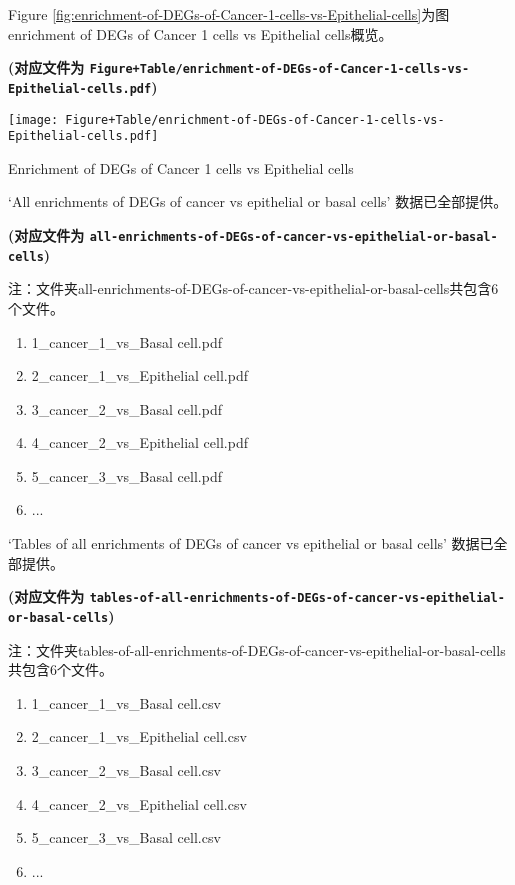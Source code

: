 \documentclass[
]{article}
\providecommand{\tightlist}{%
  \setlength{\itemsep}{0pt}\setlength{\parskip}{0pt}}
\begin{document}
Figure \ref{fig:enrichment-of-DEGs-of-Cancer-1-cells-vs-Epithelial-cells}为图enrichment of DEGs of Cancer 1 cells vs Epithelial cells概览。

\textbf{(对应文件为 \texttt{Figure+Table/enrichment-of-DEGs-of-Cancer-1-cells-vs-Epithelial-cells.pdf})}

\def\@captype{figure}
\begin{center}
\texttt{[image: Figure+Table/enrichment-of-DEGs-of-Cancer-1-cells-vs-Epithelial-cells.pdf]}
\caption{Enrichment of DEGs of Cancer 1 cells vs Epithelial cells}\label{fig:enrichment-of-DEGs-of-Cancer-1-cells-vs-Epithelial-cells}
\end{center}

`All enrichments of DEGs of cancer vs epithelial or basal cells' 数据已全部提供。

\textbf{(对应文件为 \texttt{all-enrichments-of-DEGs-of-cancer-vs-epithelial-or-basal-cells})}

\begin{center}\begin{tcolorbox}[colback=gray!10, colframe=gray!50, width=0.9\linewidth, arc=1mm, boxrule=0.5pt]注：文件夹all-enrichments-of-DEGs-of-cancer-vs-epithelial-or-basal-cells共包含6个文件。

\begin{enumerate}\tightlist
\item 1\_cancer\_1\_vs\_Basal cell.pdf
\item 2\_cancer\_1\_vs\_Epithelial cell.pdf
\item 3\_cancer\_2\_vs\_Basal cell.pdf
\item 4\_cancer\_2\_vs\_Epithelial cell.pdf
\item 5\_cancer\_3\_vs\_Basal cell.pdf
\item ...
\end{enumerate}\end{tcolorbox}
\end{center}

`Tables of all enrichments of DEGs of cancer vs epithelial or basal cells' 数据已全部提供。

\textbf{(对应文件为 \texttt{tables-of-all-enrichments-of-DEGs-of-cancer-vs-epithelial-or-basal-cells})}

\begin{center}\begin{tcolorbox}[colback=gray!10, colframe=gray!50, width=0.9\linewidth, arc=1mm, boxrule=0.5pt]注：文件夹tables-of-all-enrichments-of-DEGs-of-cancer-vs-epithelial-or-basal-cells共包含6个文件。

\begin{enumerate}\tightlist
\item 1\_cancer\_1\_vs\_Basal cell.csv
\item 2\_cancer\_1\_vs\_Epithelial cell.csv
\item 3\_cancer\_2\_vs\_Basal cell.csv
\item 4\_cancer\_2\_vs\_Epithelial cell.csv
\item 5\_cancer\_3\_vs\_Basal cell.csv
\item ...
\end{enumerate}\end{tcolorbox}
\end{center}
\end{document}
